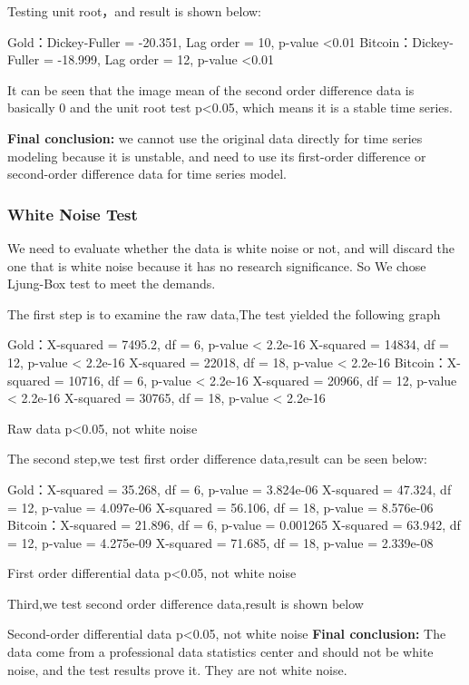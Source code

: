 \documentclass{mcmthesis}
\begin{document}
Testing unit root，and result is shown below:

Gold：Dickey-Fuller = -20.351, Lag order = 10, p-value <0.01
Bitcoin：Dickey-Fuller = -18.999, Lag order = 12, p-value <0.01

It can be seen that the image mean of the second order difference data is basically 0 and the unit root test p<0.05, which means it is a stable time series.

\textbf{Final conclusion:} we cannot use the original data directly for time series modeling because it is unstable, and need to use its first-order difference or second-order difference data for time series model.


\subsubsection{White Noise Test}
We need to evaluate whether the data is white noise or not, 
and will discard the one that is white noise because it has no research significance.
So We chose Ljung-Box test to meet the demands.

The first step is to examine the raw data,The test yielded the following graph

Gold：X-squared = 7495.2, df = 6, p-value < 2.2e-16
X-squared = 14834, df = 12, p-value < 2.2e-16
X-squared = 22018, df = 18, p-value < 2.2e-16
Bitcoin：X-squared = 10716, df = 6, p-value < 2.2e-16
X-squared = 20966, df = 12, p-value < 2.2e-16
X-squared = 30765, df = 18, p-value < 2.2e-16

Raw data p<0.05, not white noise

The second step,we test first order difference data,result can be seen below:

Gold：X-squared = 35.268, df = 6, p-value = 3.824e-06
X-squared = 47.324, df = 12, p-value = 4.097e-06
X-squared = 56.106, df = 18, p-value = 8.576e-06
Bitcoin：X-squared = 21.896, df = 6, p-value = 0.001265
X-squared = 63.942, df = 12, p-value = 4.275e-09
X-squared = 71.685, df = 18, p-value = 2.339e-08

First order differential data p<0.05, not white noise

Third,we test second order difference data,result is shown below

Second-order differential data p<0.05, not white noise
\textbf{Final conclusion: }
The data come from a professional data statistics center and should not be white noise, and the test results prove it. They are not white noise.
\end{document}
